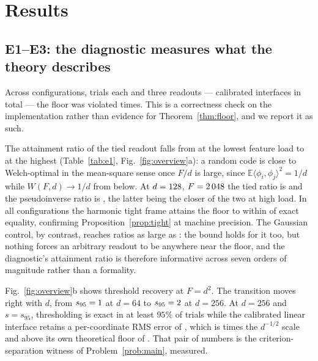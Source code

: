 \documentclass[preprint,12pt]{elsarticle}
\theoremstyle{definition}
\newcommand{\E}{\mathbb{E}}
\begin{document}
\section{Results}
\label{sec:results}

\subsection{E1--E3: the diagnostic measures what the theory describes}
\label{sec:res-e1}

Across \EoneConfigs{} configurations, \EoneTrials{} trials each and three readouts ---
\EoneMeasurements{} calibrated interfaces in total --- the floor was violated
\EoneViolations{} times. This is a correctness check on the implementation rather than
evidence for Theorem~\ref{thm:floor}, and we report it as such.

The attainment ratio of the tied readout falls from \EoneTiedRatioMax{} at the lowest feature
load to \EoneTiedRatioMin{} at the highest (Table~\ref{tab:e1}, Fig.~\ref{fig:overview}a): a
random code is close to Welch-optimal in the mean-square sense once $F/d$ is large, since
$\E\langle\phi_i,\phi_j\rangle^2=1/d$ while $W(F,d)\to1/d$ from below. At $d=128$,
$F=2\,048$ the tied ratio is \EoneTopTiedRatio{} and the pseudoinverse ratio is
\EoneTopPinvRatio, the latter being the closer of the two at high load. In all
\EoneTightFrameConfigs{} configurations the harmonic tight frame attains the floor to within
\EoneTightFrameDev{} of exact equality, confirming Proposition~\ref{prop:tight} at machine
precision. The Gaussian control, by contrast, reaches ratios as large as
\EoneGaussianRatioMax: the bound holds for it too, but nothing forces an arbitrary readout to
be anywhere near the floor, and the diagnostic's attainment ratio is therefore informative
across seven orders of magnitude rather than a formality.

Fig.~\ref{fig:overview}b shows threshold recovery at $F=d^2$. The transition moves right with
$d$, from $s_{95}=1$ at $d=64$ to $s_{95}=2$ at $d=256$. At
$d=256$ and $s=s_{95}$, thresholding is exact in at least $95\%$ of trials while the calibrated
linear interface retains a per-coordinate RMS error of \EtwoTwoFiveSixLinRms, which is
\EtwoTwoFiveSixLinRmsOverRoot{} times the $d^{-1/2}$ scale and above its own theoretical floor
of \EtwoTwoFiveSixLinRmsFloor. That pair of numbers is the criterion-separation witness of
Problem~\ref{prob:main}, measured.
\end{document}
